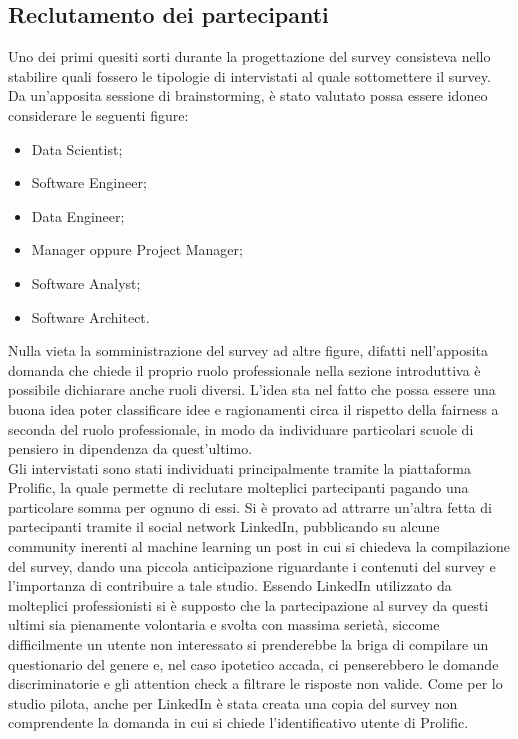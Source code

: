 \subsection{Reclutamento dei partecipanti}
Uno dei primi quesiti sorti durante la progettazione del survey consisteva nello stabilire quali fossero le tipologie di intervistati al quale sottomettere il survey. Da un'apposita sessione di brainstorming, è stato valutato possa essere idoneo considerare le seguenti figure:
\begin{itemize}
    \item Data Scientist;
    \item Software Engineer;
    \item Data Engineer;
    \item Manager oppure Project Manager;
    \item Software Analyst;
    \item Software Architect.
\end{itemize}
Nulla vieta la somministrazione del survey ad altre figure, difatti nell'apposita domanda che chiede il proprio ruolo professionale nella sezione introduttiva è possibile dichiarare anche ruoli diversi. L'idea sta nel fatto che possa essere una buona idea poter classificare idee e ragionamenti circa il rispetto della fairness a seconda del ruolo professionale, in modo da individuare particolari scuole di pensiero in dipendenza da quest'ultimo.\\
Gli intervistati sono stati individuati principalmente tramite la piattaforma Prolific, la quale permette di reclutare molteplici partecipanti pagando una particolare somma per ognuno di essi. Si è provato ad attrarre un'altra fetta di partecipanti tramite il social network LinkedIn, pubblicando su alcune community inerenti al machine learning un post in cui si chiedeva la compilazione del survey, dando una piccola anticipazione riguardante i contenuti del survey e l'importanza di contribuire a tale studio. Essendo LinkedIn utilizzato da molteplici professionisti si è supposto che la partecipazione al survey da questi ultimi sia pienamente volontaria e svolta con massima serietà, siccome difficilmente un utente non interessato si prenderebbe la briga di compilare un questionario del genere e, nel caso ipotetico accada, ci penserebbero le domande discriminatorie e gli attention check a filtrare le risposte non valide. Come per lo studio pilota, anche per LinkedIn è stata creata una copia del survey non comprendente la domanda in cui si chiede l'identificativo utente di Prolific.\\
